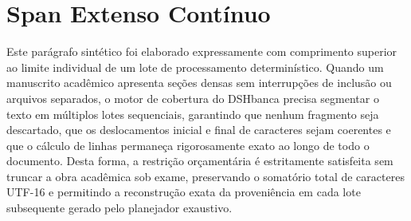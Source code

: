 \documentclass{article}
\begin{document}
\section{Span Extenso Contínuo}
Este parágrafo sintético foi elaborado expressamente com comprimento superior ao limite individual de um lote de processamento determinístico. Quando um manuscrito acadêmico apresenta seções densas sem interrupções de inclusão ou arquivos separados, o motor de cobertura do DSHbanca precisa segmentar o texto em múltiplos lotes sequenciais, garantindo que nenhum fragmento seja descartado, que os deslocamentos inicial e final de caracteres sejam coerentes e que o cálculo de linhas permaneça rigorosamente exato ao longo de todo o documento. Desta forma, a restrição orçamentária é estritamente satisfeita sem truncar a obra acadêmica sob exame, preservando o somatório total de caracteres UTF-16 e permitindo a reconstrução exata da proveniência em cada lote subsequente gerado pelo planejador exaustivo.
\end{document}

